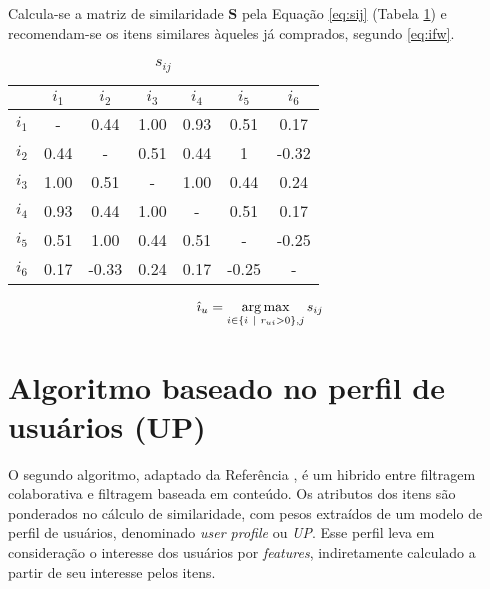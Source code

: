 Calcula-se a matriz de similaridade $\mathbf{S}$ pela Equação \ref{eq:sij} (Tabela \ref{tab:sij}) e recomendam-se os itens similares àqueles já comprados, segundo \ref{eq:ifw}.

\begin{table}[p]
\begin{center}
    \caption{$s_{ij}$}
    \label{tab:sij}
    \begin{tabular}{ | c | c | c | c | c | c | c | } 
    \hline
     & $i_1$ & $i_2$ & $i_3$ & $i_4$ & $i_5$ & $i_6$  \\ \hline
     $i_1$ & - &  0.44 & 1.00 & 0.93 &  0.51 &  0.17 \\ \hline
     $i_2$ & 0.44 &         - & 0.51 & 0.44 &  1 & -0.32  \\ \hline
     $i_3$ & 1.00 &  0.51 &        - & 1.00 &  0.44 &  0.24 \\ \hline
     $i_4$ & 0.93 &  0.44 & 1.00 &        - &  0.51 &  0.17 \\ \hline
     $i_5$ & 0.51 &  1.00 & 0.44 & 0.51 &         - & -0.25 \\ \hline
     $i_6$ & 0.17 & -0.33 & 0.24 & 0.17 & -0.25 &         - \\ \hline
    \end{tabular}
\end{center}
\end{table}



\begin{equation}
\label{eq:ifw} 
    \hat{\imath}_u = \operatorname*{arg\,max}_{i \in \left\{i~|~r_{ui} > 0\right\}, j}{s_{ij}}
\end{equation} 



\section{Algoritmo baseado no perfil de usuários (UP)} %
\label{sec:algoritmo_baseado_no_perfil_de_usu_rios_}


O segundo algoritmo, adaptado da Referência , é um hibrido entre filtragem colaborativa e filtragem baseada em conteúdo. Os atributos dos itens são ponderados no cálculo de similaridade, com pesos extraídos de um modelo de perfil de usuários, denominado \textit{user profile} ou \textit{UP}. Esse perfil leva em consideração o interesse dos usuários por \textit{features}, indiretamente calculado a partir de seu interesse pelos itens. 

